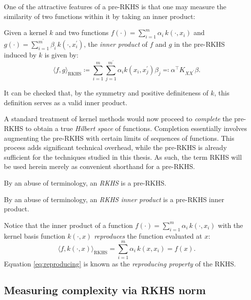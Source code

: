 \begin{refsection}
One of the attractive features of a pre-RKHS is that one may measure the similarity of two functions within it by taking an inner product:

\begin{definition} Given a kernel $k$ and two functions $f(\cdot) = \sum_{i=1}^m \alpha_i \,k(\cdot,x_i)$ and $g(\cdot) = \sum_{i=1}^{m^\prime} \beta_i\,k(\cdot,x_i^\prime)$, the \textit{inner product} of $f$ and $g$ in the pre-RKHS induced by $k$ is given by:
\begin{equation*}
    \langle f, g \rangle_\mathrm{RKHS} \coloneqq \sum_{i=1}^m \sum_{j=1}^{m^\prime} \alpha_i k(x_i,x_j^\prime) \beta_j \eqqcolon \alpha^\top K_{XX^\prime} \beta.
\end{equation*}
\end{definition}
It can be checked that, by the symmetry and positive definiteness of $k$, this definition serves as a valid inner product.

A standard treatment of kernel methods would now proceed to \textit{complete} the pre-RKHS to obtain a true \textit{Hilbert space} of functions. Completion essentially involves augmenting the pre-RKHS with certain limits of sequences of functions. This process adds significant technical overhead, while the pre-RKHS is already sufficient for the techniques studied in this thesis. As such, the term RKHS will be used herein merely as convenient shorthand for a pre-RKHS.

\begin{definition}[RKHS]\label{def:rkhs} By an abuse of terminology, an \textit{RKHS} is a pre-RKHS.
\end{definition}
\begin{definition} By an abuse of terminology, an \textit{RKHS inner product} is a pre-RKHS inner product.
\end{definition}

Notice that the inner product of a function $f(\cdot) = \sum_{i=1}^m \alpha_i \,k(\cdot,x_i)$ with the kernel basis function $k(\cdot,x)$ \textit{reproduces} the function evaluated at $x$:
\begin{equation}\label{eq:reproducing}
    \langle f, k(\cdot,x) \rangle_{\mathrm{RKHS}} = \sum_{i=1}^m \alpha_i \,k(x,x_i) = f(x).
\end{equation}
Equation \ref{eq:reproducing} is known as the \textit{reproducing property} of the RKHS.

\subsection{Measuring complexity via RKHS norm}


\end{refsection}
